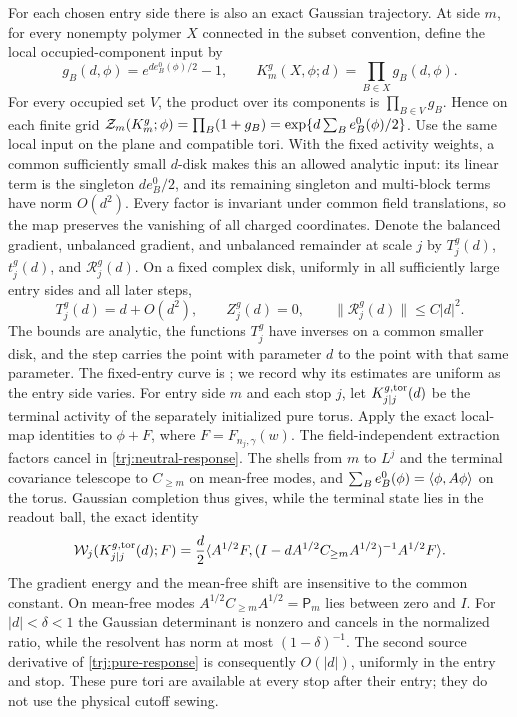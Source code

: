 For each chosen entry side there is also an exact Gaussian trajectory.
At side \(m\), for every nonempty polymer \(X\) connected in the
subset convention, define the local occupied-component input by
\[
 g_B(d,\phi)=e^{d e_B^0(\phi)/2}-1,\qquad
 K_m^g(X,\phi;d)=\prod_{B\in X}g_B(d,\phi).
\]
For every occupied set \(V\), the product over its components is
\(\prod_{B\in V}g_B\).  Hence on each finite grid
\(\mathcal Z_m(K_m^g;\phi)=\prod_B(1+g_B)
=\exp\{d\sum_Be_B^0(\phi)/2\}\).  Use the same local input on the
plane and compatible tori.  With the fixed activity weights, a common
sufficiently small \(d\)-disk makes this an allowed analytic input:
its linear term is the singleton \(d e_B^0/2\), and its remaining
singleton and multi-block terms have norm \(O(d^2)\).  Every factor
is invariant under common field translations, so the map preserves
the vanishing of all charged coordinates.  Denote the balanced
gradient, unbalanced gradient, and unbalanced remainder at scale \(j\)
by \(T_j^g(d)\), \(t_j^g(d)\), and \(\mathcal R_j^g(d)\).
On a fixed complex disk,
uniformly in all sufficiently large entry sides and all later steps,
\begin{equation}\label{trj:gaussian-curve}
 T_j^g(d)=d+O(d^2),\qquad Z_j^g(d)=0,
 \qquad \|\mathcal R_j^g(d)\|\le C|d|^2.
\end{equation}
The bounds are analytic, the functions \(T_j^g\) have inverses on a
common smaller disk, and the step carries the point with parameter
\(d\) to the point with that same parameter.  The fixed-entry curve is
\cite[Lemma~10.3]{B}; we record why its estimates are uniform as the
entry side varies.  For entry side \(m\) and each stop \(j\), let
\(K^{g,\rm tor}_{j|j}(d)\) be the terminal activity of the separately
initialized pure torus.  Apply the exact local-map identities to
\(\phi+F\), where \(F=F_{n_j,\gamma}(w)\).  The field-independent
extraction factors cancel in \eqref{trj:neutral-response}.  The shells
from \(m\) to \(L^j\) and the terminal covariance telescope to
\(C_{\ge m}\) on mean-free modes, and
\(\sum_B e_B^0(\phi)=\langle \phi,A\phi\rangle\) on the torus.  Gaussian
completion thus gives, while the terminal state lies in the readout
ball, the exact identity
\begin{equation}\label{trj:pure-response}
 \mathcal W_j(K^{g,\rm tor}_{j|j}(d);F)
 =\frac d2\langle A^{1/2}F,
       (I-dA^{1/2}C_{\ge m}A^{1/2})^{-1}A^{1/2}F\rangle.
\end{equation}
The gradient energy and the mean-free shift are insensitive to the
common constant.
On mean-free modes \(A^{1/2}C_{\ge m}A^{1/2}=\mathsf P_m\) lies
between zero and \(I\).  For \(|d|<\delta<1\) the Gaussian determinant
is nonzero and cancels in the normalized ratio, while the resolvent
has norm at most \((1-\delta)^{-1}\).  The second source derivative
of \eqref{trj:pure-response} is consequently \(O(|d|)\), uniformly in
the entry and stop.  These pure tori are available at every stop after
their entry; they do not use the physical cutoff sewing.

